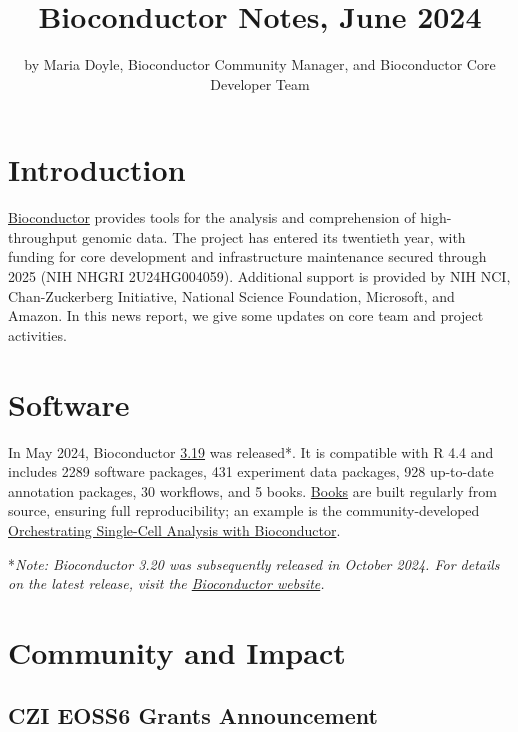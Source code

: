 \title{Bioconductor Notes, June 2024}


\author{by Maria Doyle, Bioconductor Community Manager, and Bioconductor Core Developer Team}

\maketitle


\section{Introduction}\label{introduction}

\href{https://bioconductor.org}{Bioconductor} provides
tools for the analysis and comprehension of high-throughput genomic
data. The project has entered its twentieth year, with funding
for core development and infrastructure maintenance secured
through 2025 (NIH NHGRI 2U24HG004059). Additional support is provided
by NIH NCI, Chan-Zuckerberg Initiative, National Science Foundation,
Microsoft, and Amazon. In this news report, we give some updates on
core team and project activities.

\section{Software}\label{software}

In May 2024, Bioconductor \href{https://bioconductor.org/news/bioc_3_19_release/}{3.19} was released*. It is compatible with R 4.4 and includes 2289 software packages, 431 experiment data packages, 928 up-to-date annotation packages, 30 workflows, and 5 books. \href{https://bioconductor.org/books/release/}{Books} are built regularly from source, ensuring full reproducibility; an example is the community-developed \href{https://bioconductor.org/books/release/OSCA/}{Orchestrating Single-Cell Analysis with Bioconductor}.

*\emph{Note: Bioconductor 3.20 was subsequently released in October 2024. For details on the latest release, visit the \href{https://bioconductor.org/news/}{Bioconductor website}.}

\section{Community and Impact}\label{community-and-impact}

\subsection{CZI EOSS6 Grants Announcement}\label{czi-eoss6-grants-announcement}

